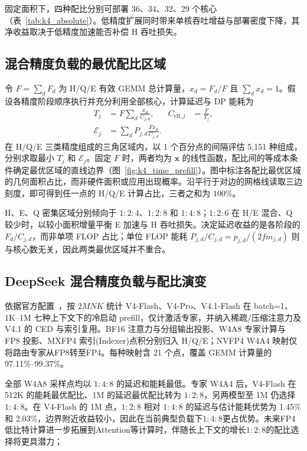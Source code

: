 固定面积下，四种配比分别可部署 36、34、32、29 个核心（表~\ref{tab:k4_absolute}）。低精度扩展同时带来单核吞吐增益与部署密度下降，其净收益取决于低精度加速能否补偿 H 吞吐损失。

\begin{table}[!t]
\centering
\caption{Area-constrained N12 deployment. $A_C$: core area (mm$^2$); $C$: TFLOP/s; $P$: DP-only power (W).}
\label{tab:k4_absolute}
\begingroup\footnotesize\setlength{\tabcolsep}{3pt}

\endgroup
\end{table}

\subsection{混合精度负载的最优配比区域}
\label{sec:k4_simplex}

令 $F=\sum_d F_d$ 为 H/Q/E 有效 GEMM 总计算量，$x_d=F_d/F$ 且 $\sum_d x_d=1$。假设各精度阶段顺序执行并充分利用全部核心，计算延迟与 DP 能耗为
\begin{align}
T_j&=F\sum_d\frac{x_d}{C_{j,d}},&
C_{\mathrm{eff},j}&=\frac{F}{T_j},
\label{eq:k4_time}\\
\mathcal E_j&=\sum_d P_{j,d}\frac{Fx_d}{C_{j,d}}.
\label{eq:k4_energy}
\end{align}
在 H/Q/E 三类精度组成的三角区域内，以 1 个百分点的间隔评估 5,151 种组成，分别求取最小 $T_j$ 和 $\mathcal E_j$。固定 $F$ 时，两者均为 $\boldsymbol x$ 的线性函数，配比间的等成本条件确定最优区域的直线边界（图~\ref{fig:k4_time_prefill}）。图中标注各配比最优区域的几何面积占比，而非硬件面积或应用出现概率。沿平行于对边的网格线读取三边刻度，即可得到任一点的 H/Q/E 计算占比，三者之和为 $100\%$。

H、E、Q 密集区域分别倾向于 $1:2:4$、$1:2:8$ 和 $1:4:8$；$1:2:6$ 在 H/E 混合、Q 较少时，以较小面积增量平衡 E 加速与 H 吞吐损失。决定延迟收益的是各阶段的 $F_d/C_{j,d}$，而非单项 FLOP 占比；单位 FLOP 能耗 $P_{j,d}/C_{j,d}=p_{j,d}/(2fm_{j,d})$ 则与核心数无关，因此两类最优区域并不重合。

\subsection{DeepSeek 混合精度负载与配比演变}
\label{sec:k4_prefill}

依据官方配置~\cite{deepseekv4,deepseekv4flashsource,deepseekv4prosource,deepseekv41source}，按 $2MNK$ 统计 V4-Flash、V4-Pro、V4.1-Flash 在 batch=1、1K--1M 七种上下文下的冷启动 prefill，仅计激活专家，并纳入稀疏/压缩注意力及 V4.1 的 CED 与索引复用。BF16 注意力与分组输出投影、W4A8 专家计算与 FP8 投影、MXFP4 索引(Indexer)点积分别归入 H/Q/E；NVFP4 W4A4 映射仅将路由专家从FP8转至FP4。每种映射含 21 个点，覆盖 GEMM 计算量的 97.11\%--99.37\%。

全部 W4A8 采样点均以 $1:4:8$ 的延迟和能耗最低。专家 W4A4 后，V4-Flash 在 512K 的能耗最优配比、1M 的延迟最优配比转为 $1:2:8$，另两模型至 1M 仍选择 $1:4:8$。在 V4-Flash 的 1M 点，$1:2:8$ 相对 $1:4:8$ 的延迟与估计能耗优势为 1.45\% 和 2.03\%，边界附近收益较小，因此在当前典型负载下$1:4:8$更占优势。未来FP4低比特计算进一步拓展到Attention等计算时，伴随长上下文的增长$1:2:8$的配比选择将更具潜力；